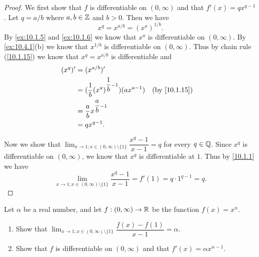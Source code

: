 \begin{proof}
  We first show that \(f\) is differentiable on \((0, \infty)\) and that \(f'(x) = q x^{q - 1}\).
  Let \(q = a / b\) where \(a, b \in \mathbb{Z}\) and \(b > 0\).
  Then we have
  \[
    x^q = x^{a / b} = (x^a)^{1 / b}.
  \]
  By \cref{ex:10.1.5} and \cref{ex:10.1.6} we know that \(x^a\) is differentiable on \((0, \infty)\).
  By \cref{ex:10.4.1}(b) we know that \(x^{1 / b}\) is differentiable on \((0, \infty)\).
  Thus by chain rule (\cref{10.1.15}) we know that \(x^q = x^{a / b}\) is differentiable and
  \begin{align*}
    (x^q)' & = (x^{a / b})'                                                            \\
           & = (\dfrac{1}{b} (x^a)^{\dfrac{1}{b} - 1}) (a x^{a - 1}) &  & \by{10.1.15} \\
           & = \dfrac{a}{b} x^{\dfrac{a}{b} - 1}                                       \\
           & = q x^{q - 1}.
  \end{align*}

  Now we show that \(\lim_{x \to 1 ; x \in (0, \infty) \setminus \{1\}} \dfrac{x^q - 1}{x - 1} = q\) for every \(q \in \mathbb{Q}\).
  Since \(x^q\) is differentiable on \((0, \infty)\), we know that \(x^q\) is differentiable at \(1\).
  Thus by \cref{10.1.1} we have
  \[
    \lim_{x \to 1 ; x \in (0, \infty) \setminus \{1\}} \dfrac{x^q - 1}{x - 1} = f'(1) = q \cdot 1^{q - 1} = q.
  \]
\end{proof}

\begin{ex}\label{ex:10.4.3}
  Let \(\alpha\) be a real number, and let \(f : (0, \infty) \to \mathbb{R}\) be the function \(f(x) = x^{\alpha}\).
  \begin{enumerate}
    \item Show that \(\lim_{x \to 1 ; x \in (0, \infty) \setminus \{1\}} \dfrac{f(x) - f(1)}{x - 1} = \alpha\).
    \item Show that \(f\) is differentiable on \((0, \infty)\) and that \(f'(x) = \alpha x^{\alpha - 1}\).
  \end{enumerate}
\end{ex}


